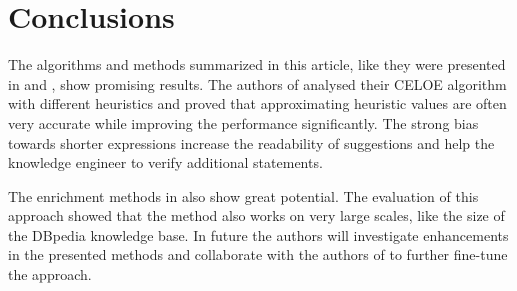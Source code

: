 \section{Conclusions}
The algorithms and methods summarized in this article, like they were presented
in \cite{paper1} and \cite{paper2}, show promising results. The authors of
\cite{paper1} analysed their CELOE algorithm with different heuristics and
proved that approximating heuristic values are often very accurate while
improving the performance significantly. The strong bias towards shorter
expressions increase the readability of suggestions and help the knowledge
engineer to verify additional statements. 

The enrichment methods in \cite{paper2} also show great potential. The
evaluation of this approach showed that the method also works on very large
scales, like the size of the DBpedia knowledge base. In future the authors
will investigate enhancements in the presented methods and collaborate with the
authors of \cite{31} to further fine-tune the approach.
